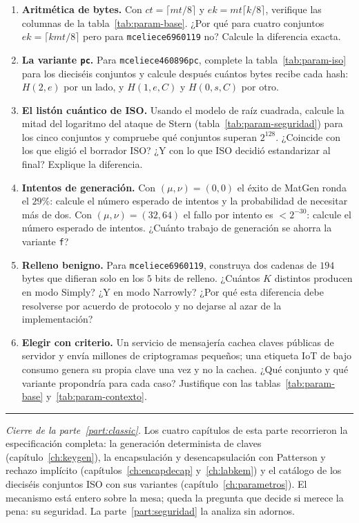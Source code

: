 \documentclass[11pt,a4paper,oneside]{report}
\begin{document}
\begin{enumerate}[leftmargin=1.6em,itemsep=4pt]
  \item \textbf{Aritmética de bytes.} Con $ct=\lceil mt/8\rceil$ y
        $ek=mt\lceil k/8\rceil$, verifique las columnas de la
        tabla~\ref{tab:param-base}. ¿Por qué para cuatro conjuntos
        $ek=\lceil kmt/8\rceil$ pero para \texttt{mceliece6960119} no?
        Calcule la diferencia exacta.
  \item \textbf{La variante \texttt{pc}.} Para
        \texttt{mceliece460896pc}, complete la
        tabla~\ref{tab:param-iso} para los dieciséis conjuntos y
        calcule después cuántos bytes recibe cada hash: $H(2,e)$ por
        un lado, y $H(1,e,C)$ y $H(0,s,C)$ por otro.
  \item \textbf{El listón cuántico de ISO.} Usando el modelo de raíz
        cuadrada, calcule la mitad del logaritmo del ataque de Stern
        (tabla~\ref{tab:param-seguridad}) para los cinco conjuntos y
        compruebe qué conjuntos superan $2^{128}$. ¿Coincide con los
        que eligió el borrador ISO? ¿Y con lo que ISO decidió
        estandarizar al final? Explique la diferencia.
  \item \textbf{Intentos de generación.} Con $(\mu,\nu)=(0,0)$ el
        éxito de MatGen ronda el $29\%$: calcule el número esperado de
        intentos y la probabilidad de necesitar más de dos. Con
        $(\mu,\nu)=(32,64)$ el fallo por intento es $<2^{-30}$:
        calcule el número esperado de intentos. ¿Cuánto trabajo de
        generación se ahorra la variante \texttt{f}?
  \item \textbf{Relleno benigno.} Para \texttt{mceliece6960119},
        construya dos cadenas de $194$ bytes que difieran solo en los
        $5$ bits de relleno. ¿Cuántos $K$ distintos producen en modo
        Simply? ¿Y en modo Narrowly? ¿Por qué esta diferencia debe
        resolverse por acuerdo de protocolo y no dejarse al azar de
        la implementación?
  \item \textbf{Elegir con criterio.} Un servicio de mensajería
        cachea claves públicas de servidor y envía millones de
        criptogramas pequeños; una etiqueta IoT de bajo consumo
        genera su propia clave una vez y no la cachea. ¿Qué conjunto
        y qué variante propondría para cada caso? Justifique con las
        tablas~\ref{tab:param-base} y~\ref{tab:param-contexto}.
\end{enumerate}

\begin{center}\rule{0.55\textwidth}{0.4pt}\end{center}
\medskip
\noindent\textit{Cierre de la parte~\ref{part:classic}.} Los cuatro
capítulos de esta parte recorrieron la especificación completa: la
generación determinista de claves (capítulo~\ref{ch:keygen}), la
encapsulación y desencapsulación con Patterson y rechazo implícito
(capítulos~\ref{ch:encapdecap} y~\ref{ch:labkem}) y el catálogo de
los dieciséis conjuntos ISO con sus variantes
(capítulo~\ref{ch:parametros}). El mecanismo está entero sobre la
mesa; queda la pregunta que decide si merece la pena: su seguridad.
La parte~\ref{part:seguridad} la analiza sin adornos.
\end{document}
